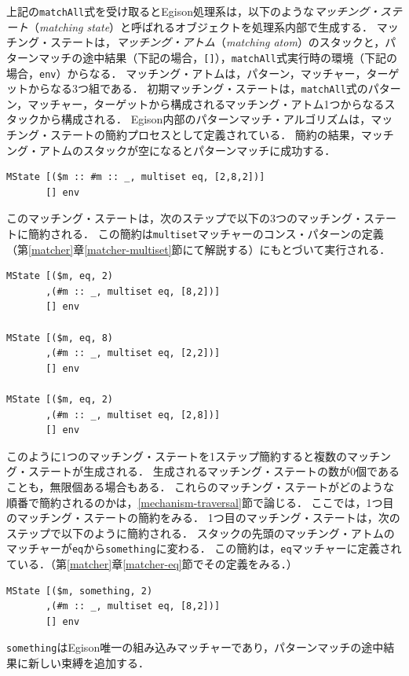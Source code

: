 上記の\lstinline{matchAll}式を受け取るとEgison処理系は，以下のような\emph{マッチング・ステート}（\emph{matching state}）と呼ばれるオブジェクトを処理系内部で生成する．
マッチング・ステートは，\emph{マッチング・アトム}（\emph{matching atom}）のスタックと，パターンマッチの途中結果（下記の場合，\lstinline{[]}），\lstinline{matchAll}式実行時の環境（下記の場合，\lstinline{env}）からなる．
マッチング・アトムは，パターン，マッチャー，ターゲットからなる3つ組である．
初期マッチング・ステートは，\lstinline{matchAll}式のパターン，マッチャー，ターゲットから構成されるマッチング・アトム1つからなるスタックから構成される．
Egison内部のパターンマッチ・アルゴリズムは，マッチング・ステートの簡約プロセスとして定義されている．
簡約の結果，マッチング・アトムのスタックが空になるとパターンマッチに成功する．
\begin{lstlisting}[language=egison,numbers=none]
MState [($m :: #m :: _, multiset eq, [2,8,2])]
       [] env
\end{lstlisting}
このマッチング・ステートは，次のステップで以下の3つのマッチング・ステートに簡約される．
この簡約は\lstinline{multiset}マッチャーのコンス・パターンの定義（第\ref{matcher}章\ref{matcher-multiset}節にて解説する）にもとづいて実行される．
\begin{lstlisting}[language=egison,numbers=none]
MState [($m, eq, 2)
       ,(#m :: _, multiset eq, [8,2])]
       [] env

MState [($m, eq, 8)
       ,(#m :: _, multiset eq, [2,2])]
       [] env

MState [($m, eq, 2)
       ,(#m :: _, multiset eq, [2,8])]
       [] env
\end{lstlisting}
このように1つのマッチング・ステートを1ステップ簡約すると複数のマッチング・ステートが生成される．
生成されるマッチング・ステートの数が0個であることも，無限個ある場合もある．
これらのマッチング・ステートがどのような順番で簡約されるのかは，\ref{mechanism-traversal}節で論じる．
ここでは，1つ目のマッチング・ステートの簡約をみる．
1つ目のマッチング・ステートは，次のステップで以下のように簡約される．
スタックの先頭のマッチング・アトムのマッチャーが\lstinline{eq}から\lstinline{something}に変わる．
この簡約は，\lstinline{eq}マッチャーに定義されている．（第\ref{matcher}章\ref{matcher-eq}節でその定義をみる．）
\begin{lstlisting}[language=egison,numbers=none]
MState [($m, something, 2)
       ,(#m :: _, multiset eq, [8,2])]
       [] env
\end{lstlisting}
\lstinline{something}はEgison唯一の組み込みマッチャーであり，パターンマッチの途中結果に新しい束縛を追加する．
